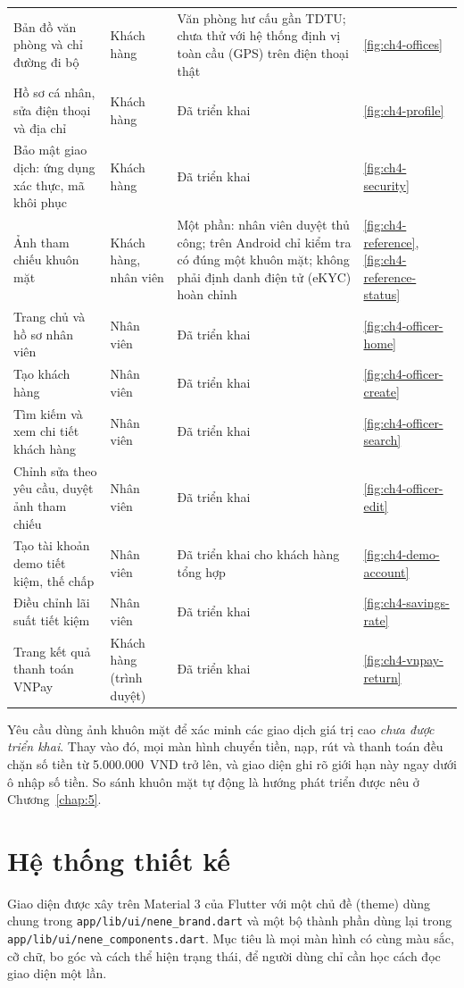 \begin{longtable}{@{}p{}p{}p{}p{}@{}}
Bản đồ văn phòng và chỉ đường đi bộ & Khách hàng & Văn phòng hư cấu gần TDTU; chưa thử với hệ thống định vị toàn cầu (GPS) trên điện thoại thật & \ref{fig:ch4-offices}\\
Hồ sơ cá nhân, sửa điện thoại và địa chỉ & Khách hàng & Đã triển khai & \ref{fig:ch4-profile}\\
Bảo mật giao dịch: ứng dụng xác thực, mã khôi phục & Khách hàng & Đã triển khai & \ref{fig:ch4-security}\\
Ảnh tham chiếu khuôn mặt & Khách hàng, nhân viên & Một phần: nhân viên duyệt thủ công; trên Android chỉ kiểm tra có đúng một khuôn mặt; không phải định danh điện tử (eKYC) hoàn chỉnh & \ref{fig:ch4-reference}, \ref{fig:ch4-reference-status}\\
Trang chủ và hồ sơ nhân viên & Nhân viên & Đã triển khai & \ref{fig:ch4-officer-home}\\
Tạo khách hàng & Nhân viên & Đã triển khai & \ref{fig:ch4-officer-create}\\
Tìm kiếm và xem chi tiết khách hàng & Nhân viên & Đã triển khai & \ref{fig:ch4-officer-search}\\
Chỉnh sửa theo yêu cầu, duyệt ảnh tham chiếu & Nhân viên & Đã triển khai & \ref{fig:ch4-officer-edit}\\
Tạo tài khoản demo tiết kiệm, thế chấp & Nhân viên & Đã triển khai cho khách hàng tổng hợp & \ref{fig:ch4-demo-account}\\
Điều chỉnh lãi suất tiết kiệm & Nhân viên & Đã triển khai & \ref{fig:ch4-savings-rate}\\
Trang kết quả thanh toán VNPay & Khách hàng (trình duyệt) & Đã triển khai & \ref{fig:ch4-vnpay-return}\\
\end{longtable}

Yêu cầu dùng ảnh khuôn mặt để xác minh các giao dịch giá trị cao \emph{chưa được triển khai}. Thay vào đó, mọi màn hình chuyển tiền, nạp, rút và thanh toán đều chặn số tiền từ 5.000.000~VND trở lên, và giao diện ghi rõ giới hạn này ngay dưới ô nhập số tiền. So sánh khuôn mặt tự động là hướng phát triển được nêu ở Chương~\ref{chap:5}.

\section{Hệ thống thiết kế}
\label{sec:ch4-design-system}

Giao diện được xây trên Material 3 của Flutter với một chủ đề (theme) dùng chung trong \texttt{app/\allowbreak{}lib/\allowbreak{}ui/\allowbreak{}nene\_\allowbreak{}brand.\allowbreak{}dart} và một bộ thành phần dùng lại trong \texttt{app/\allowbreak{}lib/\allowbreak{}ui/\allowbreak{}nene\_\allowbreak{}components.\allowbreak{}dart}. Mục tiêu là mọi màn hình có cùng màu sắc, cỡ chữ, bo góc và cách thể hiện trạng thái, để người dùng chỉ cần học cách đọc giao diện một lần.

